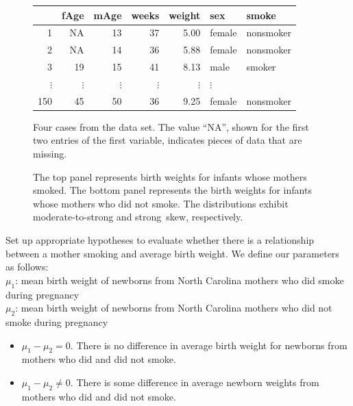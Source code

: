 \begin{figure}[h]
\centering
\begin{tabular}{rrrrrll}
  \hline
 & fAge & mAge & weeks & weight & sex & smoke \\ 
  \hline
1 & NA & 13 &  37 & 5.00 & female & nonsmoker \\ 
  2 & NA & 14 &  36 & 5.88 & female & nonsmoker \\ 
  3 & 19 & 15 &  41 & 8.13 & male & smoker \\ 
  $\vdots$ &   $\vdots$ &   $\vdots$ &   $\vdots$ &   $\vdots$ &   $\vdots$ \\
  150 & 45 & 50 &  36 & 9.25 & female & nonsmoker \\ 
   \hline
\end{tabular}
\caption{Four cases from the  data set. The value ``NA'', shown for the first two entries of the first variable, indicates pieces of data that are missing.}
\label{babySmokeDF}
\end{figure}

\begin{figure}[hhh]
\centering
\caption{The top panel represents birth weights for infants whose mothers smoked. The bottom panel represents the birth weights for infants whose mothers who did not smoke. The distributions exhibit moderate-to-strong and strong~skew, respectively.}
\label{babySmokePlotOfTwoGroupsToExamineSkew}
\end{figure}

\D{\newpage}

\begin{examplewrap}
\begin{nexample}{Set up appropriate hypotheses to evaluate whether there is a relationship between a mother smoking and average birth weight.}\label{babySmokeHTForWeight}
We define our parameters as follows:\\
$\mu_{1}$:  mean birth weight of newborns from North Carolina mothers who did smoke during pregnancy\\
$\mu_2$: mean birth weight of newborns from North Carolina mothers who did not smoke during pregnancy\\
\begin{itemize}
\setlength{\itemsep}{0mm}
\item[$H_0$:] $\mu_{1} - \mu_{2} = 0$.  There is no difference in average birth weight for newborns from mothers who did and did not smoke. 
\item[$H_A$:] $\mu_{1} - \mu_{2} \neq 0$. There is some difference in average newborn weights from mothers who did and did not smoke.
\end{itemize}
\end{nexample}
\end{examplewrap}

